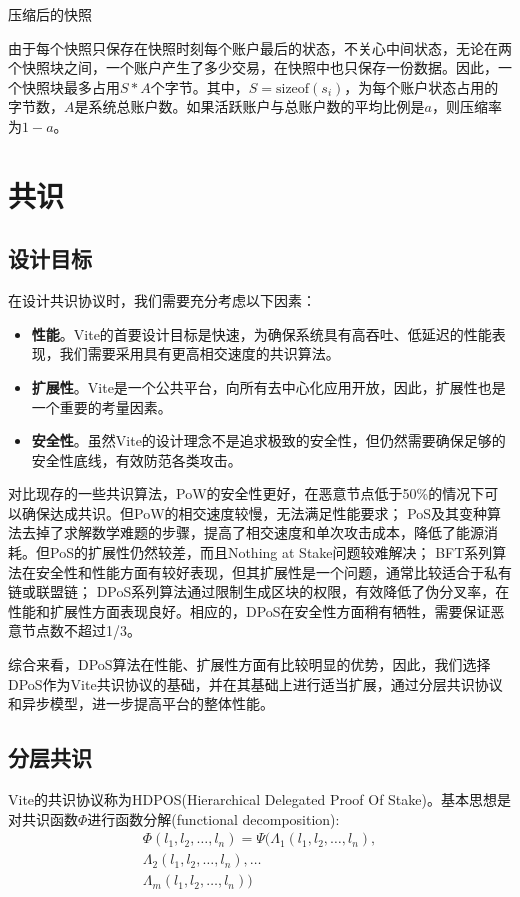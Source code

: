\documentclass[UTF8,nofonts]{ctexart}
\makeatletter
\newenvironment{figurehere}
 {\def\@captype{figure}}
 {}
\makeatother
\begin{document}
\begin{multicols}{2}
\begin{center}
\begin{figurehere}
\begin{tikzpicture}
\end{tikzpicture}

\caption{压缩后的快照}
\label{fig:compact-snapshot}
\end{figurehere}
\end{center}

由于每个快照只保存在快照时刻每个账户最后的状态，不关心中间状态，无论在两个快照块之间，一个账户产生了多少交易，在快照中也只保存一份数据。因此，一个快照块最多占用$S * A$个字节。其中，$S = \text{sizeof}(s_{i})$，为每个账户状态占用的字节数，$A$是系统总账户数。如果活跃账户与总账户数的平均比例是$a$，则压缩率为$1-a$。

\section{共识}
\subsection{设计目标}
在设计共识协议时，我们需要充分考虑以下因素：
\begin{itemize}
	\item \textbf{性能}。Vite的首要设计目标是快速，为确保系统具有高吞吐、低延迟的性能表现，我们需要采用具有更高相交速度的共识算法。
	\item \textbf{扩展性}。Vite是一个公共平台，向所有去中心化应用开放，因此，扩展性也是一个重要的考量因素。
	\item \textbf{安全性}。虽然Vite的设计理念不是追求极致的安全性，但仍然需要确保足够的安全性底线，有效防范各类攻击。
\end{itemize}

对比现存的一些共识算法，PoW的安全性更好，在恶意节点低于50\%的情况下可以确保达成共识。但PoW的相交速度较慢，无法满足性能要求；
PoS及其变种算法去掉了求解数学难题的步骤，提高了相交速度和单次攻击成本，降低了能源消耗。但PoS的扩展性仍然较差，而且Nothing at Stake问题\cite{problems}较难解决；
BFT系列算法在安全性和性能方面有较好表现，但其扩展性是一个问题，通常比较适合于私有链或联盟链；
DPoS\cite{dpos}系列算法通过限制生成区块的权限，有效降低了伪分叉率，在性能和扩展性方面表现良好。相应的，DPoS在安全性方面稍有牺牲，需要保证恶意节点数不超过1/3\cite{dpos2}。

综合来看，DPoS算法在性能、扩展性方面有比较明显的优势，因此，我们选择DPoS作为Vite共识协议的基础，并在其基础上进行适当扩展，通过分层共识协议和异步模型，进一步提高平台的整体性能。

\subsection{分层共识}
Vite的共识协议称为HDPOS(Hierarchical Delegated Proof Of Stake)。基本思想是对共识函数$\Phi$进行函数分解(functional decomposition):
\begin{equation}
\begin{split}
\Phi(l_1,l_2,\dots,l_n) = \Psi(\Lambda_1(l_1,l_2,\dots,l_n), \\
\Lambda_2(l_1,l_2,\dots,l_n),\dots \\
\Lambda_m(l_1,l_2,\dots,l_n))
\end{split}
\end{equation}


\end{multicols}
\end{document}
